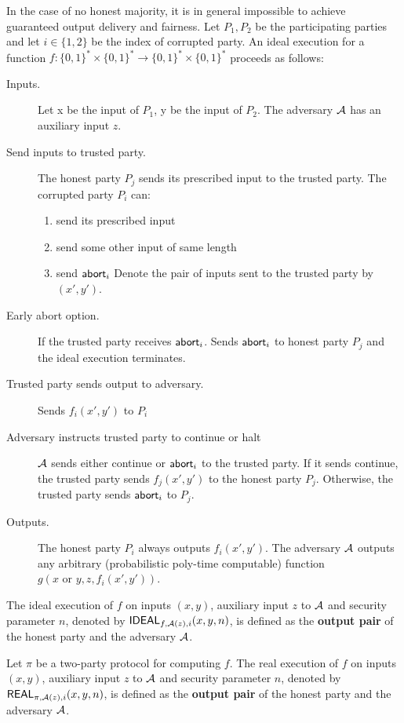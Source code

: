\begin{description}[leftmargin=0em]
\item[Execution in ideal mode.] In the case of no honest majority, it is in general impossible to achieve guaranteed output delivery and fairness. Let $P_1,P_2$ be the participating parties and let $i\in\{1,2\}$ be the index of corrupted party. An ideal execution for a function $f:\{0,1\}^*\times\{0,1\}^*\to\{0,1\}^*\times\{0,1\}^*$ proceeds as follows:
\begin{description}
\item[Inputs.] Let x be the input of $P_1$, y be the input of $P_2$. The adversary $\mathcal{A}$ has an auxiliary input $z$.
\item[Send inputs to trusted party.] The honest party $P_j$ sends its prescribed input to the trusted party. The corrupted party $P_i$ can:
\begin{enumerate}
\item send its prescribed input
\item send some other input of same length
\item send ${\sf abort}_i$
Denote the pair of inputs sent to the trusted party by $(x',y')$.
\end{enumerate}
\item[Early abort option.] If the trusted party receives ${\sf abort}_i$. Sends ${\sf abort}_i$ to honest party $P_j$ and the ideal execution terminates.
\item[Trusted party sends output to adversary.] Sends $f_i(x',y')$ to $P_i$
\item[Adversary instructs trusted party to continue or halt] $\mathcal{A}$ sends either {\sf continue} or ${\sf abort}_i$ to the trusted party. If it sends {\sf continue}, the trusted party sends $f_j(x',y')$ to the honest party $P_j$. Otherwise, the trusted party sends ${\sf abort}_i$ to $P_j$.
\item[Outputs.] The honest party $P_i$ always outputs $f_i(x',y')$. The adversary $\mathcal{A}$ outputs any arbitrary (probabilistic poly-time computable) function $g(x \text{ or } y,z,f_i(x',y'))$.
\end{description}
The {\sf ideal execution of }$f$ on inputs $(x,y)$, auxiliary input $z$ to $\mathcal{A}$ and security parameter $n$, denoted by ${\sf IDEAL}_{f,\mathcal{A}(z),i}(x,y,n)$, is defined as the {\bf output pair} of the honest party and the adversary $\mathcal{A}$.

\item[Execution in the real model.] Let $\pi$ be a two-party protocol for computing $f$.
The {\sf real execution of }$f$ on inputs $(x,y)$, auxiliary input $z$ to $\mathcal{A}$ and security parameter $n$, denoted by ${\sf REAL}_{\pi,\mathcal{A}(z),i}(x,y,n)$, is defined as the {\bf output pair} of the honest party and the adversary $\mathcal{A}$.
\end{description}

